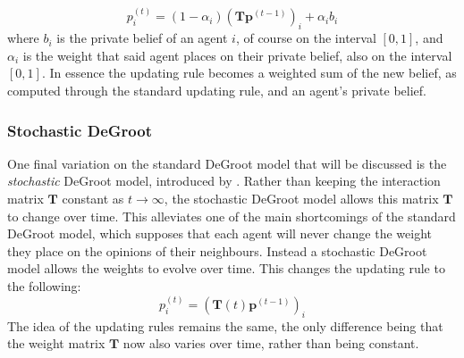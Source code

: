 \documentclass{article}
\newcommand{\beli}[3][2]{p_{#2}^{(#3)}}
\begin{document}
\begin{equation}
    \beli{i}{t} = (1-\alpha_i)(\textbf{T}\textbf{p}^{(t-1)})_i + \alpha_i b_i
\end{equation}
where $b_i$ is the private belief of an agent $i$, of course on the interval $[0, 1]$, and $\alpha_i$ is the weight that said agent places on their private belief, also on the interval $[0, 1]$. In essence the updating rule becomes a weighted sum of the new belief, as computed through the standard updating rule, and an agent's private belief.

\subsubsection{Stochastic DeGroot}

One final variation on the standard DeGroot model that will be discussed is the \emph{stochastic} DeGroot model, introduced by \cite{chatterjee1977stochastic}. Rather than keeping the interaction matrix $\textbf{T}$ constant as $t \to \infty$, the stochastic DeGroot model allows this matrix $\textbf{T}$ to change over time. This alleviates one of the main shortcomings of the standard DeGroot model, which supposes that each agent will never change the weight they place on the opinions of their neighbours. Instead a stochastic DeGroot model allows the weights to evolve over time. This changes the updating rule to the following:
\begin{equation*}
    \beli{i}{t} =(\textbf{T}(t)\textbf{p}^{(t-1)})_i
\end{equation*}
The idea of the updating rules remains the same, the only difference being that the weight matrix $\textbf{T}$ now also varies over time, rather than being constant.
\newpage

\printbibliography

%
%
\end{document}
